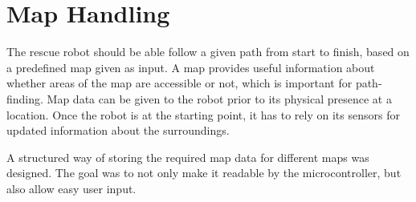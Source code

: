 
% 





\chapter{Map Handling}
\label{ch:map} %
The rescue robot should be able follow a given path from start to finish, based on a predefined map given as input.
A map provides useful information about whether areas of the map are accessible or not, which is important for path-finding.
Map data can be given to the robot prior to its physical presence at a location. Once the robot is at the starting point, it has to rely on its sensors for updated information about the surroundings.

A structured way of storing the required map data for different maps was designed. 
The goal was to not only make it readable by the microcontroller,
but also allow easy user input.

